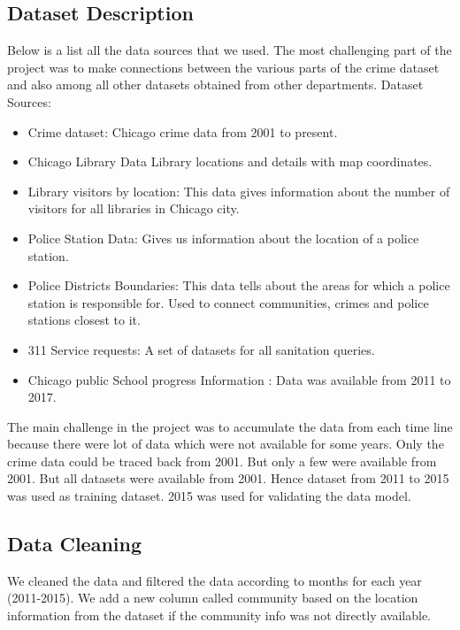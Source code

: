 \documentclass{article}
\begin{document}
\subsection{Dataset Description}
Below is a list all the data sources that we used. The most challenging part of the project was to make connections between the various parts of the crime dataset and also among all other datasets obtained from other departments. Dataset Sources:
\begin{itemize}
	\item Crime dataset\cite{crime}: Chicago crime data from 2001 to present.
	\item Chicago Library Data\cite{library_loc}  Library locations and details with map coordinates.
	\item Library visitors by location\cite{library_data}: This data gives information about the number of visitors for all libraries in Chicago city.
	\item Police Station Data\cite{police_stations}: Gives us information about the location of a police station.
	\item Police Districts Boundaries\cite{policeloc}: This data tells about the areas for which a police station is responsible for. Used to connect communities, crimes and police stations closest to it.
	\item 311 Service requests\cite{sanity}: A set of datasets for all sanitation queries.
	\item Chicago public School progress Information\cite{school} :  Data was available from 2011 to 2017.
\end{itemize} 
The main challenge in the project was to accumulate the data from each time line because there were lot of data which were not available for some years. Only the crime data could be traced back from 2001. But only a few were available from 2001. But all datasets were available from 2001. Hence dataset from 2011 to 2015 was used as training  dataset. 2015 was used for validating the data model.
\subsection{Data Cleaning}
We cleaned the data and filtered the data according to months for each year (2011-2015). We add a new column called community based on the location information from the dataset if the community info was not directly available.
\end{document}
